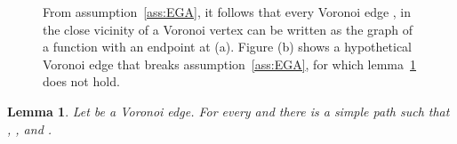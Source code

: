 \documentclass[11pt]{article}
\newtheorem{lemma}{Lemma}
\begin{document}
\begin{figure}[htbp]
   \centering
   	\quad\quad
\caption{From assumption~\ref{ass:EGA}, it follows that every Voronoi edge , 
   			in the close vicinity of a Voronoi vertex can be written as the graph of a function  with an endpoint at  (a). 
		Figure (b) shows a hypothetical Voronoi edge  that breaks assumption~\ref{ass:EGA}, 
			for which lemma~\ref{lem:closureedge} does not hold. }
   \label{fig:closureedge}
\end{figure}



\begin{lemma}\label{lem:closureedge}
Let  be a Voronoi edge. 
For every  and  there is a simple path  
	such that , , and . 
\end{lemma}
\end{document}
